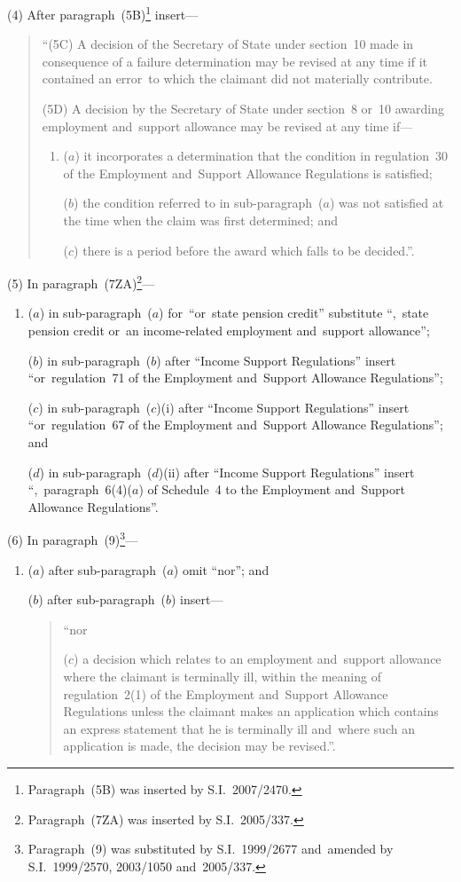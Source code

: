 \documentclass[12pt,a4paper]{article}
\begin{document}
(4) After paragraph~(5B)\footnote{Paragraph~(5B) was inserted by S.I.~2007/2470.} insert—
\begin{quotation}
“(5C) A decision of the Secretary of State under section~10 made in consequence of a failure determination may be revised at any time if it contained an error~to which the claimant did not materially contribute.

(5D) A decision by the Secretary of State under section~8 or~10 awarding employment and~support allowance may be revised at any time if—
\begin{enumerate}\item[]
($a$) it incorporates a determination that the condition in regulation~30 of the Employment and~Support Allowance Regulations is satisfied;

($b$) the condition referred to in sub-paragraph~($a$)  was not satisfied at the time when the claim was first determined; and

($c$) there is a period before the award which falls to be decided.”.
\end{enumerate}
\end{quotation}

(5) In paragraph~(7ZA)\footnote{Paragraph~(7ZA) was inserted by S.I.~2005/337.}—
\begin{enumerate}\item[]
($a$) in sub-paragraph~($a$)  for~“or~state pension credit” substitute “,~state pension credit or~an income-related employment and~support allowance”;

($b$) in sub-paragraph~($b$)  after “Income Support Regulations” insert “or~regulation~71 of the Employment and~Support Allowance Regulations”;

($c$) in sub-paragraph~($c$)(i)  after “Income Support Regulations” insert “or~regulation~67 of the Employment and~Support Allowance Regulations”; and

($d$) in sub-paragraph~($d$)(ii)  after “Income Support Regulations” insert “,~paragraph~6(4)($a$)  of Schedule~4 to the Employment and~Support Allowance Regulations”.
\end{enumerate}

(6) In paragraph~(9)\footnote{Paragraph~(9) was substituted by S.I.~1999/2677 and~amended by S.I.~1999/2570, 2003/1050 and~2005/337.}—
\begin{enumerate}\item[]
($a$) after sub-paragraph~($a$)  omit “nor”; and

($b$) after sub-paragraph~($b$)  insert—
\begin{quotation}
“nor

($c$) a decision which relates to an employment and~support allowance where the claimant is terminally ill, within the meaning of regulation~2(1) of the Employment and~Support Allowance Regulations unless the claimant makes an application which contains an express statement that he is terminally ill and~where such an application is made, the decision may be revised.”.
\end{quotation}
\end{enumerate}
\end{document}
